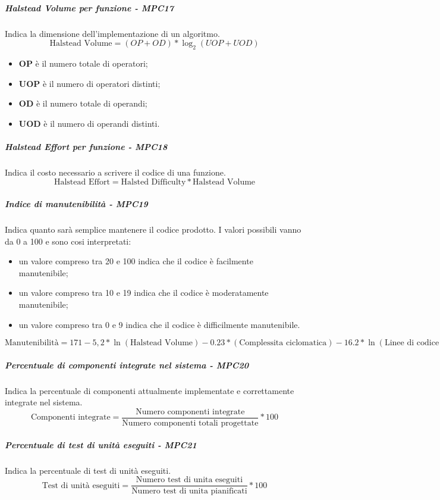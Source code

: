 \subparagraph{Halstead Volume per funzione - MPC17}
Indica la dimensione dell'implementazione di un algoritmo.
\begin{equation*}
\text{Halstead Volume} = (OP + OD) * \log_2(UOP + UOD)
\end{equation*}	
\begin{itemize}
	\item \textbf{OP} è il numero totale di operatori;
	\item \textbf{UOP} è il numero di operatori distinti;
	\item \textbf{OD} è il numero totale di operandi;
	\item \textbf{UOD} è il numero di operandi distinti.
\end{itemize}
\subparagraph{Halstead Effort per funzione - MPC18}
Indica il costo necessario a scrivere il codice di una funzione.
\begin{equation*}
\text{Halstead Effort} = \text{Halsted Difficulty} * \text{Halstead Volume}
\end{equation*}	
\subparagraph{Indice di manutenibilità - MPC19}
Indica quanto sarà semplice mantenere il codice prodotto.
I valori possibili vanno da 0 a 100 e sono cosi interpretati:
\begin{itemize}
	\item un valore compreso tra 20 e 100 indica che il codice è facilmente manutenibile;
	\item un valore compreso tra 10 e 19 indica che il codice è moderatamente manutenibile;
	\item un valore compreso tra 0 e 9 indica che il codice è difficilmente manutenibile.
\end{itemize}
\begin{equation*}
\text{Manutenibilità} = 171 - 5,2 * \ln(\text{Halstead Volume}) - 0.23 * (\text{Complessita ciclomatica}) - 16.2 * \ln(\text{Linee di codice})
\end{equation*}
\subparagraph{Percentuale di componenti integrate nel sistema - MPC20}
Indica la percentuale di componenti attualmente implementate e correttamente integrate nel sistema.
\begin{equation*}
\text{Componenti integrate} = \frac{\text{Numero componenti integrate}}{\text{Numero componenti totali progettate}} * 100
\end{equation*}
\subparagraph{Percentuale di test di unità eseguiti - MPC21}
Indica la percentuale di test di unità eseguiti.
\begin{equation*}
\text{Test di unità eseguiti} = \frac{\text{Numero test di unita eseguiti}}{\text{Numero test di unita pianificati}} * 100
\end{equation*}
